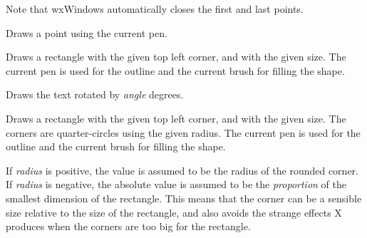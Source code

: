Note that wxWindows automatically closes the first and last points.


\label{wxdcdrawpoint}


Draws a point using the current pen.

\label{wxdcdrawrectangle}


Draws a rectangle with the given top left corner, and with the given
size.  The current pen is used for the outline and the current brush
for filling the shape.

\label{wxdcdrawrotatedtext}


Draws the text rotated by {\it angle} degrees.



\label{wxdcdrawroundedrectangle}


Draws a rectangle with the given top left corner, and with the given
size.  The corners are quarter-circles using the given radius. The
current pen is used for the outline and the current brush for filling
the shape.

If {\it radius} is positive, the value is assumed to be the
radius of the rounded corner. If {\it radius} is negative,
the absolute value is assumed to be the {\it proportion} of the smallest
dimension of the rectangle. This means that the corner can be
a sensible size relative to the size of the rectangle, and also avoids
the strange effects X produces when the corners are too big for
the rectangle.

\label{wxdcdrawspline}


